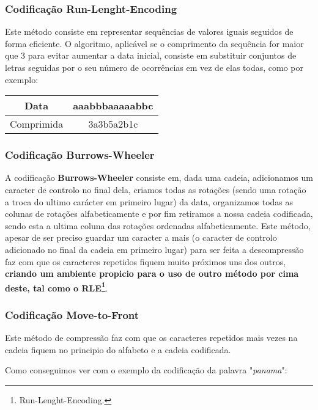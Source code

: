 \documentclass[11pt,journal,compsoc]{IEEEtran}
\begin{document}
    \subsubsection{Codificação \textbf{Run-Lenght-Encoding}}
    Este método consiste em representar sequências de valores iguais seguidos de forma eficiente. O algoritmo, aplicável se o comprimento da sequência for maior que 3 para evitar aumentar a data inicial, consiste em substituir conjuntos de letras seguidas por o seu número de ocorrências em vez de elas todas, como por exemplo:
    
    \begin{center}
    \begin{tabular}{ |c|c| } 
      \hline
      Data & aaabbbaaaaabbc \\
      \hline
      Comprimida & 3a3b5a2b1c \\
      \hline
    \end{tabular}
    \end{center}
    
    
    \subsubsection{Codificação \textbf{Burrows-Wheeler}}
    A codificação \textbf{Burrows-Wheeler} consiste em, dada uma cadeia, adicionamos um caracter de controlo no final dela, criamos todas as rotações (sendo uma rotação a troca do ultimo carácter em primeiro lugar) da data, organizamos todas as colunas de rotações alfabeticamente e por fim retiramos a nossa cadeia codificada, sendo esta a ultima coluna das rotações ordenadas alfabeticamente.
    Este método, apesar de ser preciso guardar um caracter a mais (o caracter de controlo adicionado no final da cadeia em primeiro lugar) para ser feita a descompressão faz com que os caracteres repetidos fiquem muito próximos uns dos outros, \textbf{criando um ambiente propicio para o uso de outro método por cima deste, tal como o RLE\footnote{Run-Lenght-Encoding.}}.
    
    
    
    \subsubsection{Codificação \textbf{Move-to-Front}}
    Este método de compressão faz com que os caracteres repetidos mais vezes na cadeia fiquem no principio do alfabeto e a cadeia codificada. 
    
    
    Como conseguimos ver com o exemplo da codificação da palavra "\textit{panama}":
    
\end{document}
